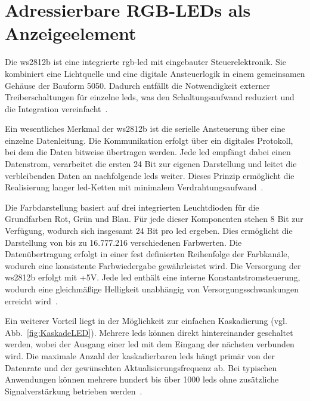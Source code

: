 
\section{Adressierbare RGB-LEDs als Anzeigeelement}
Die \gls{ws2812b} ist eine integrierte \gls{rgb}-\gls{led} mit eingebauter Steuerelektronik. 
Sie kombiniert eine Lichtquelle und eine digitale Ansteuerlogik in einem gemeinsamen Gehäuse der Bauform 5050. 
Dadurch entfällt die Notwendigkeit externer Treiberschaltungen für einzelne \gls{led}s, was den Schaltungsaufwand reduziert und die Integration vereinfacht~\cite{Worldsemi2013}.

Ein wesentliches Merkmal der \gls{ws2812b} ist die serielle Ansteuerung über eine einzelne Datenleitung. 
Die Kommunikation erfolgt über ein digitales Protokoll, bei dem die Daten bitweise übertragen werden. 
Jede \gls{led} empfängt dabei einen Datenstrom, verarbeitet die ersten 24 Bit zur eigenen Darstellung und leitet die verbleibenden Daten an nachfolgende \gls{led}s weiter. 
Dieses Prinzip ermöglicht die Realisierung langer \gls{led}-Ketten mit minimalem Verdrahtungsaufwand~\cite{Worldsemi2013}. 

Die Farbdarstellung basiert auf drei integrierten Leuchtdioden für die Grundfarben Rot, Grün und Blau. 
Für jede dieser Komponenten stehen 8 Bit zur Verfügung, wodurch sich insgesamt 24 Bit pro \gls{led} ergeben. 
Dies ermöglicht die Darstellung von bis zu 16.777.216 verschiedenen Farbwerten. 
Die Datenübertragung erfolgt in einer fest definierten Reihenfolge der Farbkanäle, wodurch eine konsistente Farbwiedergabe gewährleistet wird.
Die Versorgung der \gls{ws2812b} erfolgt mit +5V. 
Jede \gls{led} enthält eine interne Konstantstromsteuerung, wodurch eine gleichmäßige Helligkeit unabhängig von Versorgungsschwankungen erreicht wird~\cite{Worldsemi2013}. 

Ein weiterer Vorteil liegt in der Möglichkeit zur einfachen Kaskadierung (vgl. Abb.~\ref{fig:KaskadeLED}).
Mehrere \gls{led}s können direkt hintereinander geschaltet werden, wobei der Ausgang einer \gls{led} mit dem Eingang der nächsten verbunden wird. 
Die maximale Anzahl der kaskadierbaren \gls{led}s hängt primär von der Datenrate und der gewünschten Aktualisierungsfrequenz ab. 
Bei typischen Anwendungen können mehrere hundert bis über 1000 \gls{led}s ohne zusätzliche Signalverstärkung betrieben werden~\cite{Worldsemi2013}.

